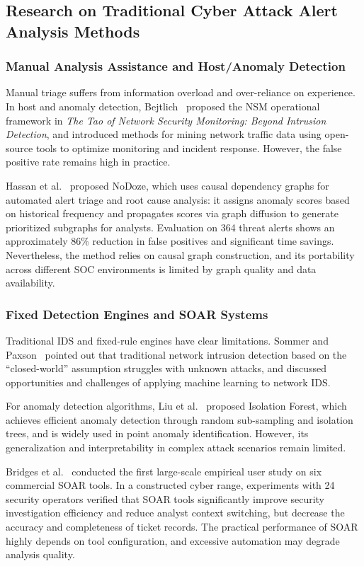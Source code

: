 \documentclass[sigconf,authordraft]{acmart}
\begin{document}
\subsection{Research on Traditional Cyber Attack Alert Analysis Methods}

\subsubsection{Manual Analysis Assistance and Host/Anomaly Detection}

Manual triage suffers from information overload and over-reliance on experience. In host and anomaly detection, Bejtlich~\cite{ref6} proposed the NSM operational framework in \textit{The Tao of Network Security Monitoring: Beyond Intrusion Detection}, and introduced methods for mining network traffic data using open-source tools to optimize monitoring and incident response. However, the false positive rate remains high in practice.

Hassan et al.~\cite{ref7} proposed NoDoze, which uses causal dependency graphs for automated alert triage and root cause analysis: it assigns anomaly scores based on historical frequency and propagates scores via graph diffusion to generate prioritized subgraphs for analysts. Evaluation on 364 threat alerts shows an approximately 86\% reduction in false positives and significant time savings. Nevertheless, the method relies on causal graph construction, and its portability across different SOC environments is limited by graph quality and data availability.

\subsubsection{Fixed Detection Engines and SOAR Systems}

Traditional IDS and fixed-rule engines have clear limitations. Sommer and Paxson~\cite{ref8} pointed out that traditional network intrusion detection based on the ``closed-world'' assumption struggles with unknown attacks, and discussed opportunities and challenges of applying machine learning to network IDS.

For anomaly detection algorithms, Liu et al.~\cite{ref9} proposed Isolation Forest, which achieves efficient anomaly detection through random sub-sampling and isolation trees, and is widely used in point anomaly identification. However, its generalization and interpretability in complex attack scenarios remain limited.

Bridges et al.~\cite{ref10} conducted the first large-scale empirical user study on six commercial SOAR tools. In a constructed cyber range, experiments with 24 security operators verified that SOAR tools significantly improve security investigation efficiency and reduce analyst context switching, but decrease the accuracy and completeness of ticket records. The practical performance of SOAR highly depends on tool configuration, and excessive automation may degrade analysis quality.
\end{document}

